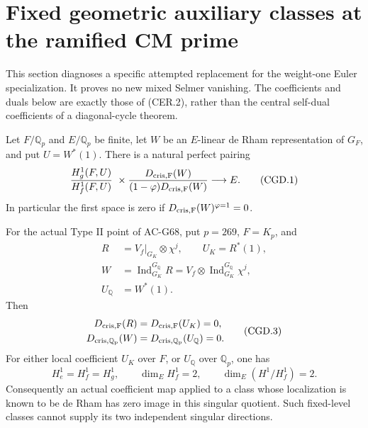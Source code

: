\section{Fixed geometric auxiliary classes at the ramified CM prime}
\label{sec:cubic-geometric-route-diagnostic}

This section diagnoses a specific attempted replacement for the
weight-one Euler specialization. It proves no new mixed Selmer
vanishing. The coefficients and duals below are exactly those of
(CER.2), rather than the central self-dual coefficients of a
diagonal-cycle theorem.

\begin{proposition}
\label{AC-G69-local}
Let \(F/\mathbb Q_p\) and \(E/\mathbb Q_p\) be finite, let
\(W\) be an \(E\)-linear de Rham representation of \(G_F\),
and put \(U=W^*(1)\). There is a natural perfect pairing
\[
 \frac{H_g^1(F,U)}{H_f^1(F,U)}\ \times
 \frac{D_{\rm cris,F}(W)}{(1-\varphi)D_{\rm cris,F}(W)}
       \longrightarrow E .                             \tag{CGD.1}
\]
In particular the first space is zero if
\(D_{\rm cris,F}(W)^{\varphi=1}=0\).

For the actual Type II point of AC-G68, put \(p=269\),
\(F=K_p\), and
\[
 \begin{aligned}
 R&=V_f|_{G_K}\otimes\chi^j,\qquad U_K=R^*(1),\\
 W&=\operatorname{Ind}_{G_K}^{G_{\mathbb Q}}R
     =V_f\otimes\operatorname{Ind}_{G_K}^{G_{\mathbb Q}}\chi^j,\\
 U_{\mathbb Q}&=W^*(1).
 \end{aligned}                            \tag{CGD.2}
\]
Then
\[
 \begin{split}
 D_{\rm cris,F}(R)&=D_{\rm cris,F}(U_K)=0,\\
 D_{\rm cris,\mathbb Q_p}(W)&=
          D_{\rm cris,\mathbb Q_p}(U_{\mathbb Q})=0.
 \end{split}                                             \tag{CGD.3}
\]
For either local coefficient \(U_K\) over \(F\), or
\(U_{\mathbb Q}\) over \(\mathbb Q_p\), one has
\[
 H_e^1=H_f^1=H_g^1,\qquad
       \dim_E H_f^1=2,\qquad
       \dim_E(H^1/H_f^1)=2.                              \tag{CGD.4}
\]
Consequently an actual coefficient map applied to a class
whose localization is known to be de Rham has zero image in
this singular quotient. Such fixed-level classes cannot
supply its two independent singular directions.
\end{proposition}
